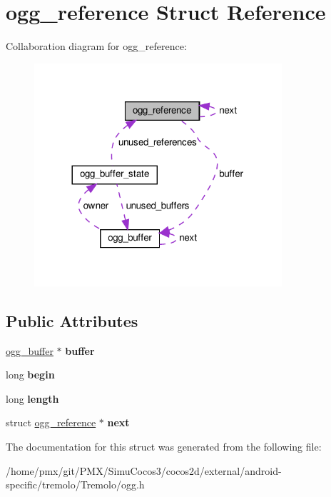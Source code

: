 \hypertarget{structogg__reference}{}\section{ogg\+\_\+reference Struct Reference}
\label{structogg__reference}


Collaboration diagram for ogg\+\_\+reference\+:
\nopagebreak
\begin{figure}[H]
\begin{center}
\leavevmode
\includegraphics[width=260pt]{structogg__reference__coll__graph}
\end{center}
\end{figure}
\subsection*{Public Attributes}
\begin{DoxyCompactItemize}
\item 
\mbox{\label{structogg__reference_a719f92980351480f89c44c4ba775ca05}} 
\hyperlink{structogg__buffer}{ogg\+\_\+buffer} $\ast$ {\bfseries buffer}
\item 
\mbox{\label{structogg__reference_a2c4caa9048eeaf590a18b7167356a239}} 
long {\bfseries begin}
\item 
\mbox{\label{structogg__reference_a8aa581e80a9b36b4ff8b3c83c92b04ef}} 
long {\bfseries length}
\item 
\mbox{\label{structogg__reference_a6d05c8aa66cfcd71c2fa0100d74304ad}} 
struct \hyperlink{structogg__reference}{ogg\+\_\+reference} $\ast$ {\bfseries next}
\end{DoxyCompactItemize}


The documentation for this struct was generated from the following file\+:\begin{DoxyCompactItemize}
\item 
/home/pmx/git/\+P\+M\+X/\+Simu\+Cocos3/cocos2d/external/android-\/specific/tremolo/\+Tremolo/ogg.\+h\end{DoxyCompactItemize}
